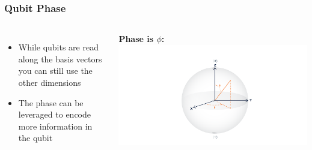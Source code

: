 \documentclass[aspectratio=169,11pt,hyperref={colorlinks=true}]{beamer}
\begin{document}
\begin{frame}
    \frametitle{Qubit Phase}
    \begin{columns}
        \begin{itemize}
            \item While qubits are read along the basis vectors you can
                still use the other dimensions
            \item The phase can be leveraged to encode more information in the qubit
        \end{itemize}
            \centering
            \textbf{Phase is $\phi$:}
            \includegraphics[width=\textwidth]{bloch_angles.png}
    \end{columns}
\end{frame}
\end{document}
